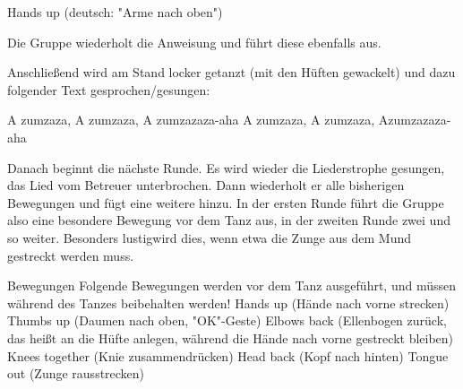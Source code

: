 Hands up   (deutsch: "Arme nach oben")\newline

Die Gruppe wiederholt die Anweisung und führt diese ebenfalls aus.\newline

Anschließend wird am Stand locker getanzt (mit den Hüften gewackelt) und dazu folgender Text gesprochen/gesungen:\newline\newline

A zumzaza, A zumzaza, A zumzazaza-aha\newline
A zumzaza, A zumzaza, Azumzazaza-aha\newline

Danach beginnt die nächste Runde. Es wird wieder die Liederstrophe gesungen, das Lied vom Betreuer unterbrochen. Dann wiederholt er alle bisherigen Bewegungen und fügt eine weitere hinzu. In der ersten Runde führt die Gruppe also eine besondere Bewegung vor dem Tanz aus, in der zweiten Runde zwei und so weiter. Besonders lustigwird dies, wenn etwa die Zunge aus dem Mund gestreckt werden muss.\newline

Bewegungen\newline\newline
Folgende Bewegungen werden vor dem Tanz ausgeführt, und müssen während des Tanzes beibehalten werden!
\newline
Hands up (Hände nach vorne strecken)\newline
Thumbs up (Daumen nach oben, "OK"-Geste)\newline
Elbows back (Ellenbogen zurück, das heißt an die Hüfte anlegen, während die Hände nach vorne gestreckt bleiben)\newline
Knees together (Knie zusammendrücken)\newline
Head back (Kopf nach hinten)\newline
Tongue out (Zunge rausstrecken)\newline
        \\


